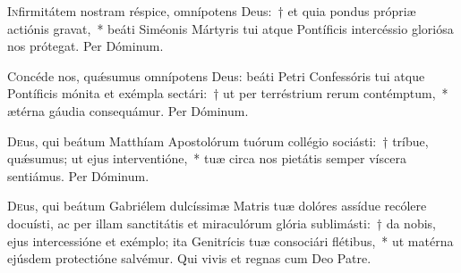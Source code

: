 \documentclass[vesperale_romanum.tex]{subfiles}
\begin{document}
\myrule


\oratio

\lettrine{I}{n}firmitátem nostram réspice, omnípotens Deus:~† et quia pondus própriæ actiónis gravat,~* beáti Siméonis Mártyris tui atque Pontíficis intercéssio gloriósa nos prótegat. Per Dóminum.

\myrule


\duplexmajus



\myrule


\duplexmtv


\oratio

\lettrine{C}{o}ncéde nos, quǽsumus omnípotens Deus: beáti Petri Confessóris tui atque Pontíficis mónita et exémpla se\-ctári:~† ut per terréstrium rerum contémptum,~* ætérna gáudia consequámur. Per Dóminum.

\quadcommferiae

\myrule






\oratio

\lettrine{D}{e}us, qui beátum Matthíam Apostolórum tuórum collégio sociásti:~† tríbue, quǽsumus; ut ejus interventióne,~* tuæ circa nos pietátis semper víscera sentiámus.
Per Dóminum.


\quadcommferiae

\myrule


\duplex

\oratio
\lettrine{D}{e}us, qui beátum Gabriélem dulcíssimæ Matris tuæ dolóres assídue recólere docuísti, ac per illam san\-ctitátis et miraculórum glória sublimásti:~† da nobis, ejus intercessióne et exémplo; ita Genitrícis tuæ consociári flétibus,~* ut matérna ejúsdem prote\-ctióne salvémur.
Qui vivis et regnas cum Deo Patre.

\quadcommferiae
\end{document}

